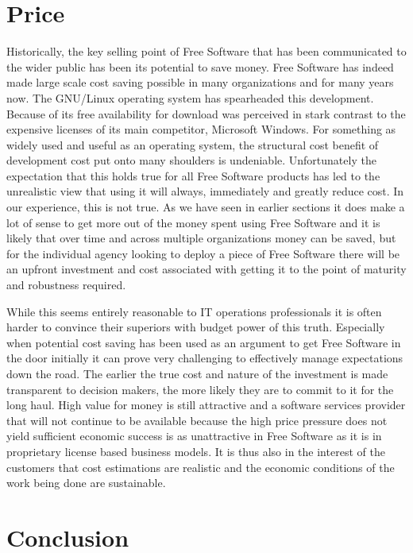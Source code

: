 \section*{Price}

Historically, the key selling point of Free Software that has been communicated
to the wider public has been its potential to save money.
Free Software has indeed made large scale cost
saving possible in many organizations and for many years now. 
The GNU/Linux operating system has spearheaded this development.
Because of its free availability for download was perceived in stark contrast 
to the expensive licenses of its main competitor, Microsoft Windows.
For something as
widely used and useful as an operating system, the structural cost benefit of
development cost put onto many shoulders is undeniable.  Unfortunately the
expectation that this holds true for all Free Software products has led to the
unrealistic view that using it will always, immediately and greatly reduce
cost. In our experience, this is not true. As we have seen in earlier sections
it does make a lot of sense to get more out of the money spent using Free
Software and it is likely that over time and across multiple organizations
money can be saved, but for the individual agency looking to deploy a piece of
Free Software there will be an upfront investment and cost associated with
getting it to the point of maturity and robustness required.

While this seems entirely reasonable to IT operations
professionals it is often harder to convince their superiors with budget power
of this truth. Especially when potential cost saving has been used as an
argument to get Free Software in the door initially it can prove very
challenging to effectively manage expectations down the road. The earlier the
true cost and nature of the investment is made transparent to decision makers,
the more likely they are to commit to it for the long haul. 
High value for money is still attractive and a software services provider that will
not continue to be available because the high price pressure does not yield
sufficient economic success is as unattractive in Free Software as it is in
proprietary license based business models. It is thus also in the interest of the
customers that cost estimations are realistic and the economic conditions of the
work being done are sustainable.

\section*{Conclusion}

